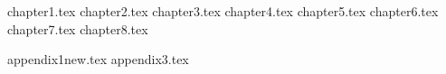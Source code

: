 \documentclass[a4paper,11pt]{book}
\begin{document}

 
\clearpage
\thispagestyle{empty}
 
\tableofcontents
\listoffigures
\listoftables
 
\mainmatter

{chapter1.tex}
{chapter2.tex}
{chapter3.tex}
{chapter4.tex}
{chapter5.tex}
{chapter6.tex}
{chapter7.tex}
{chapter8.tex}

\appendix
{appendix1new.tex}
{appendix3.tex}

 

 
\backmatter


\printbibliography

 
\end{document}
